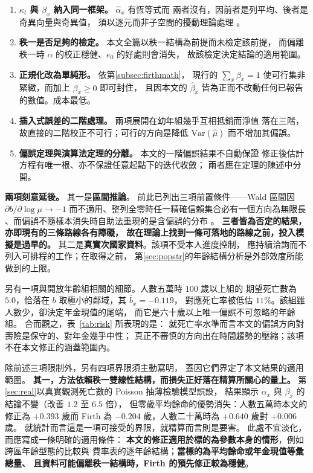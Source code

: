 \documentclass[UTF8, fontset=macnew, a4paper, 12pt]{ctexart}
\begin{document}
\begin{enumerate}[label=\arabic*.]
\item \textbf{$\kappa_t$ 與 $\beta_x$ 納入同一框架。} $\hat\alpha_x$ 有恆等式而
兩者沒有，因前者是列平均、後者是奇異向量與奇異值，
須以逐元而非子空間的擾動理論處理 \citep{abbe2020}。
\item \textbf{秩一是否足夠的檢定。} 本文全篇以秩一結構為前提而未檢定該前提，
而偏離秩一時 $\alpha$ 的校正穩健、$e_0$ 的好處則會消失，
故該檢定決定結論的適用範圍。
\item \textbf{正規化改為單純形。} 依第\ref{subsec:firthmath}，
現行的 $\sum_x\beta_x=1$ 使可行集非緊緻，而加上 $\beta_x\ge0$ 即可封住，
且因本文的 $\hat\beta_x$ 皆為正而不改動任何已報告的數值。成本最低。
\item \textbf{插入式誤差的二階處理。} 兩項展開在幼年組幾乎互相抵銷而淨值
落在三階，故直接的二階校正不可行；可行的方向是降低 $\mathrm{Var}(\hat\mu)$
而不增加其偏誤。
\item \textbf{偏誤定理與演算法定理的分離。} 本文的一階偏誤結果不自動保證
修正後估計方程有唯一根、亦不保證任意起點下的迭代收斂；
兩者應在定理的陳述中分開。
\end{enumerate}

\textbf{兩項刻意延後。} 其一是\textbf{區間推論}。
前此已列出三項前置條件——Wald 區間因 $\partial b/\partial\log\mu\to-1$
而不適用、整列全零時任一精確信賴集合必有一個方向為無限長
\citep{lewis2024}、而偏誤不隨樣本消失時自助法重現的是含偏誤的分布
\citep{cavaliere2024}。
\textbf{三者皆為否定的結果，亦即現有的三條路線各有障礙，
故在理論上找到一條可落地的路線之前，投入模擬是過早的。}
其二是\textbf{真實次國家資料}。該項不受本人進度控制，
應持續洽詢而不列入可排程的工作；在取得之前，
第\ref{sec:popstr}的年齡結構分析是外部效度所能做到的上限。

另有一項與開放年齡組相關的細節。人數五萬時 $100$ 歲以上組的
期望死亡數為 $5.0$，恰落在 $b$ 取極小的鄰域，其 $\bar b_x=-0.119$，
對應死亡率被低估 $11\%$。該組雖人數少，卻決定年金現值的尾端，
而它是六十歲以上唯一偏誤不可忽略的年齡組。
合而觀之，表~\ref{tab:risk} 所表現的是：
就死亡率水準而言本文的偏誤方向對壽險是保守的、對年金幾乎中性；
真正不審慎的方向出在時間趨勢的壓縮；該項不在本文修正的涵蓋範圍內。


除前述三項限制外，另有四項界限須主動寫明，
蓋因它們界定了本文結果的適用範圍。
\textbf{其一，方法依賴秩一雙線性結構，而損失正好落在精算所關心的量上。}
第\ref{sec:real}以真實觀測死亡數的 Poisson 抽薄檢驗模型誤設，
結果顯示 $\alpha_x$ 與 $\beta_x$ 的結論不變（改善 $1.2$ 至 $6.5$ 倍），
但零歲平均餘命的優勢消失：人數五萬時本文的修正為 $+0.393$ 歲而
Firth 為 $-0.204$ 歲，人數二十萬時為 $+0.640$ 歲對 $+0.006$ 歲。
就統計而言這是一項可接受的界限，就精算而言則是要害。
此處不宜淡化，而應寫成一條明確的適用條件：
\textbf{本文的修正適用於標的為參數本身的情形}，例如跨區年齡型態的比較與
費率表的逐年齡結構；\textbf{當標的為平均餘命或年金現值等彙總量、
且資料可能偏離秩一結構時，Firth 的預先修正較為穩健}。
\end{document}
